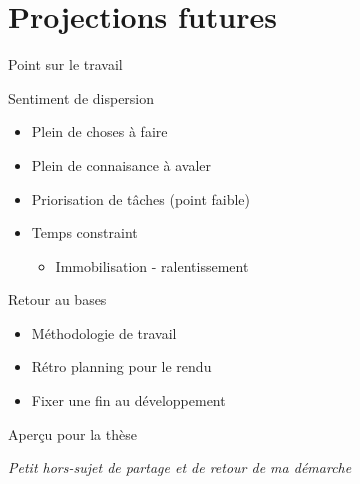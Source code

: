 \documentclass[A4,svgnames,9pt,aspectratio=169]{beamer}
\begin{document}
 
\section{Projections futures}
\frame{\sectionpage}

\begin{frame}{Point sur le travail}

  \begin{block}{Sentiment de dispersion}
    \begin{itemize}
      \item Plein de choses à faire
      \item Plein de connaisance à avaler
      \item Priorisation de tâches (point faible)
      \item Temps constraint
      \pause
      \begin{itemize}
        \item Immobilisation - ralentissement
      \end{itemize}
    \end{itemize}
  \end{block}
  \pause
  \begin{block}{Retour au bases}
    \begin{itemize}
      \item Méthodologie de travail
      \item Rétro planning pour le rendu
      \item Fixer une fin au développement
    \end{itemize}
  \end{block}
  
\end{frame}


\begin{frame}{Aperçu pour la thèse}
  \begin{center}
    \textit{Petit hors-sujet de partage et de retour de ma démarche}
  \end{center}
\end{frame}

\end{document}
